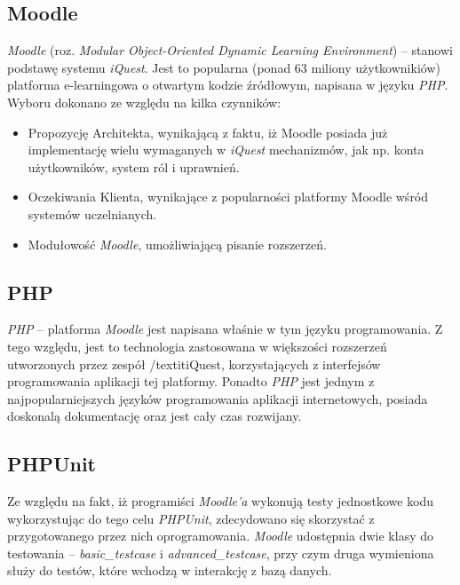 \subsection{Moodle}
\emph{Moodle} (roz. \textit{Modular Object-Oriented Dynamic Learning Environment}) -- stanowi podstawę systemu \textit{iQuest}. Jest to popularna (ponad 63 miliony użytkownikiów) platforma e-learningowa o otwartym kodzie źródłowym, napisana w języku \emph{PHP}. Wyboru dokonano ze względu na kilka czynników:
\begin{itemize}
\item{Propozycję Architekta, wynikającą z faktu, iż Moodle posiada już implementację wielu wymaganych w \textit{iQuest} mechanizmów, jak np. konta użytkowników, system ról i uprawnień.}
\item{Oczekiwania Klienta, wynikające z popularności platformy Moodle wśród systemów uczelnianych.}
\item{Modułowość \emph{Moodle}, umożliwiającą pisanie rozszerzeń.}
\end{itemize}

\subsection{PHP}
\emph{PHP} -- platforma \textit{Moodle} jest napisana właśnie w tym języku programowania. Z tego względu, jest to technologia zastosowana w większości rozszerzeń utworzonych przez zespół /textit{iQuest}, korzystających z interfejsów programowania aplikacji tej platformy. Ponadto \emph{PHP} jest jednym z najpopularniejszych języków programowania aplikacji internetowych, posiada doskonalą dokumentację oraz jest cały czas rozwijany.

\subsection{PHPUnit}
Ze względu na fakt, iż programiści \textit{Moodle'a} wykonują testy jednostkowe kodu wykorzystując do tego celu \emph{PHPUnit}, zdecydowano się skorzystać z przygotowanego przez nich oprogramowania. \textit{Moodle} udostępnia dwie klasy do testowania -- \textit{basic\_testcase} i \textit{advanced\_testcase}, przy czym druga wymieniona służy do testów, które wchodzą w interakcję z bazą danych.

